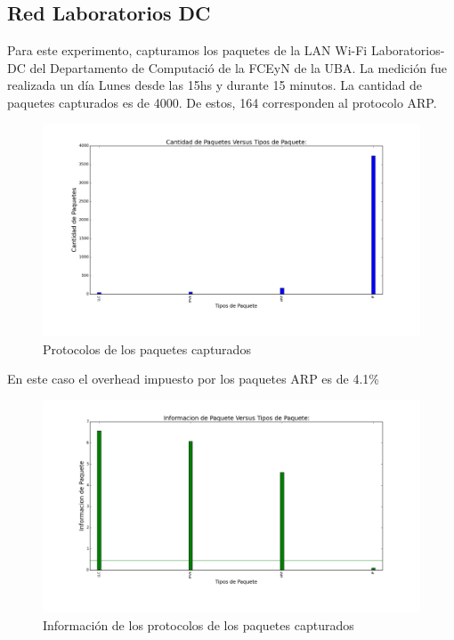 \subsection{Red Laboratorios DC}

Para este experimento, capturamos los paquetes de la LAN Wi-Fi Laboratorios-DC del Departamento de Computació de la FCEyN de la UBA. La medición fue realizada un día Lunes desde las 15hs y durante 15 minutos. La cantidad de paquetes capturados es de 4000. De estos, 164 corresponden al protocolo ARP.

\begin{figure}[H]
       \centering
       \includegraphics[width=1\textwidth]{../resultados/labo-corrida3/histogram_types.png}
       \caption{Protocolos de los paquetes capturados}
       \label{red-Starbucks-types}
\end{figure}

En este caso el overhead impuesto por los paquetes ARP es de 4.1\%

\begin{figure}[H]
       \centering
       \includegraphics[width=1\textwidth]{../resultados/labo-corrida3/histogram_types_information.png}
       \caption{Información de los protocolos de los paquetes capturados}
       \label{red-Starbucks-types-information}
\end{figure}

